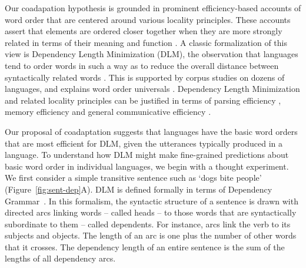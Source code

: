 \documentclass[11pt,a4paper]{article}
\begin{document}



Our coadapation hypothesis is grounded in prominent efficiency-based accounts of word order that are centered around various locality principles. These accounts assert that elements are ordered closer together when they are more strongly related in terms of their meaning and function \citep{behaghel1932deutsche,givon1985iconicity,rijkhoff-word-1986,hawkins-performance-1994}.
A classic formalization of this view is Dependency Length Minimization (DLM), the observation that languages tend to order words in such a way as to reduce the overall distance between syntactically related words \citep{rijkhoff-word-1986,hawkins-performance-1994,liu2008dependency,futrell-cross-linguistic-2015, liu-dependency-2017, futrell2020dependency}.
This is supported by corpus studies on dozens of languages, and explains word order universals \citep{rijkhoff-word-1986, hawkins-performance-1994, hahn2020universals}.
Dependency Length Minimization and related locality principles can be justified in terms of parsing efficiency \citep{hawkins-performance-1994}, memory efficiency \citep{gibson-linguistic-1998} and general communicative efficiency \citep{hahn2020universals}.



Our proposal of coadaptation suggests that languages have the basic word orders that are most efficient for DLM, given the utterances typically produced in a language.
To understand how DLM might make fine-grained predictions about basic word order in individual languages, we begin with a thought experiment.
We first consider a simple transitive sentence such as `dogs bite people' (Figure~\ref{fig:sent-dep}A). 
DLM is defined formally in terms of Dependency Grammar~\citep{hays1964dependency,hudson1984word,melcuk1988dependency,corbett1993heads,tesniere2015elements}.
In this formalism, the syntactic structure of a sentence is drawn with directed arcs linking words -- called heads -- to those words that are syntactically subordinate to them -- called dependents.
For instance, arcs link the verb to its subjects and objects.
The length of an arc is one plus the number of other words that it crosses.
The dependency length of an entire sentence is the sum of the lengths of all dependency arcs.
\end{document}
